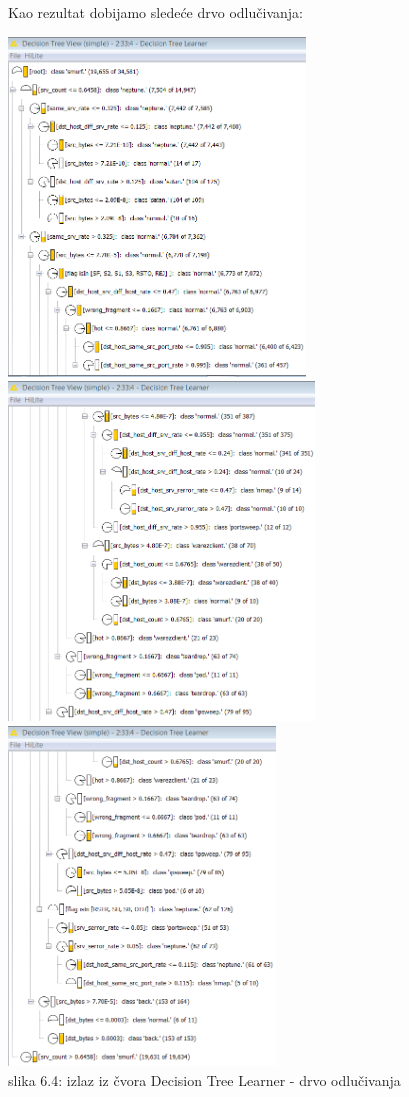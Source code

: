 \documentclass[10pt]{article}
\begin{document}
Kao rezultat dobijamo slede\' ce drvo odlu\v civanja:

\begin{center}
\includegraphics[width = 6 cm, height = 9cm]{DO1}
\includegraphics[width = 6 cm, height = 9cm]{DO2}
\includegraphics[width = 6 cm, height = 9cm]{DO3}\\
slika 6.4: izlaz iz \v cvora Decision Tree Learner - drvo odlu\v civanja\\
\end{center}
\end{document}
